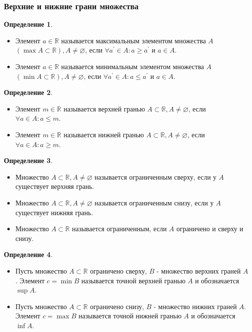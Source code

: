 \documentclass[a4paper, 12pt]{article}
\newcommand{\R}{\mathbb{R}}
\renewcommand{\emptyset}{\varnothing}
\newcommand\tab[1][.5cm]{\hspace*{#1}}
\theoremstyle{definition}
\newtheorem*{definition}{Определение}
\begin{document}
        \subsubsection{Верхние и нижние грани множества}
        \begin{definition} \tab
            \begin{itemize}
                \item Элемент $a\in \R$ называется максимальным элементом множества $A$\\ $(\max A\subset \R), A\ne \emptyset$, если $\forall a^{\prime}\in A: a\geq a^{\prime}$ и $a\in A$.
                \item Элемент $a\in \R$ называется минимальным элементом множества $A$\\ $(\min A\subset \R), A\ne \emptyset$, если $\forall a^{\prime}\in A: a\leq a^{\prime}$ и $a\in A$.
            \end{itemize}
        \end{definition}
        \begin{definition} \tab
            \begin{itemize}
                \item Элемент $m\in \R$ называется верхней гранью $A\subset \R, A\ne \emptyset$, если\\ $\forall a\in A: a\leq m$.
                \item Элемент $m\in \R$ называется нижней гранью $A\subset \R, A\ne \emptyset$, если\\ $\forall a\in A: a\geq m$.
            \end{itemize}
        \end{definition}
        \begin{definition} \tab
            \begin{itemize}
                \item Множество $A \subset \R, A\ne \emptyset$ называется ограниченным сверху, если у $A$ существует верхняя грань.
                \item Множество $A \subset \R, A\ne \emptyset$ называется ограниченным снизу, если у $A$ существует нижняя грань.
                \item Множество $A \subset \R$ называется ограниченным, если $A$ ограничено и сверху и снизу.
            \end{itemize}
        \end{definition}
        \begin{definition} \tab
            \begin{itemize}
                \item Пусть множество $A \subset \R$ ограничено сверху, $B$ - множество верхних граней $A$. Элемент $c=\min B$ называется точной верхней гранью $A$ и обозначается $\sup A$.
                \item Пусть множество $A \subset \R$ ограничено снизу, $B$ - множество нижних граней $A$. Элемент $c=\max B$ называется точной нижней гранью $A$ и обозначается $\inf A$.
            \end{itemize}
        \end{definition}
\end{document}

